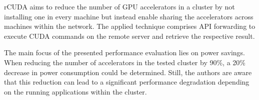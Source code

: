 rCUDA aims to reduce the number of GPU accelerators in a cluster by not installing one in every machine but instead enable sharing the accelerators across machines within the network\cite{rcuda}. The applied technique comprises API forwarding to execute CUDA commands on the remote server and retrieve the respective result.

The main focus of the presented performance evaluation lies on power savings. When reducing the number of accelerators in the tested cluster by 90\%, a 20\% decrease in power consumption could be determined. Still, the authors are aware that this reduction can lead to a significant performance degradation depending on the running applications within the cluster.
